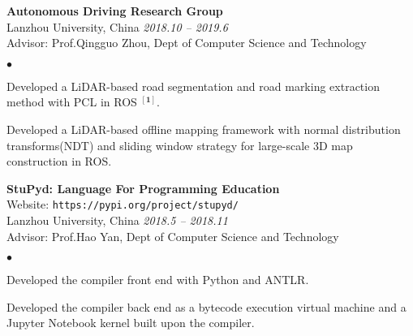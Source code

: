 \documentclass[margin,line,pifont,palatino,courier]{res}
\newenvironment{list2}{
	\begin{list}{$\bullet$}{%
			\setlength{\itemsep}{0in}
			\setlength{\parsep}{0in} \setlength{\parskip}{0in}
			\setlength{\topsep}{0in} \setlength{\partopsep}{0in}
			\setlength{\leftmargin}{0.2in}}}{\end{list}}
\begin{document}
\begin{resume}
		{\bf Autonomous Driving Research Group} \\
		Lanzhou University, China \hfill {\sl 2018.10 -- 2019.6} \\
		Advisor: Prof.Qingguo Zhou, Dept of Computer Science and Technology
		\begin{list2}
			\item Developed a LiDAR-based road segmentation and road marking extraction method with PCL in ROS $\mathbf{^{[1]}}$.
			\item Developed a LiDAR-based offline mapping framework with normal distribution transforms(NDT) and sliding window strategy for large-scale 3D map construction in ROS.
		\end{list2}
	
		{\bf StuPyd: Language For Programming Education} \\
		Website: \verb+https://pypi.org/project/stupyd/+ \\
		Lanzhou University, China \hfill {\sl 2018.5 -- 2018.11} \\
		Advisor: Prof.Hao Yan, Dept of Computer Science and Technology 
		\begin{list2}
			\item Developed the compiler front end with Python and ANTLR.
			\item Developed the compiler back end as a bytecode execution virtual machine and a Jupyter Notebook kernel built upon the compiler. 
		\end{list2}	
		


\end{resume}
\end{document}
